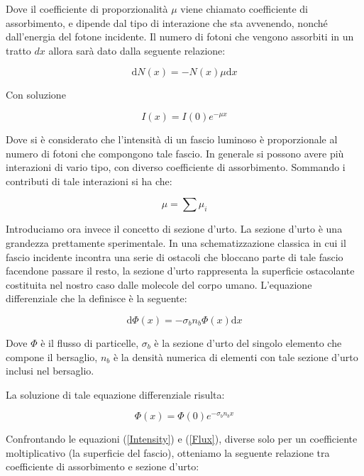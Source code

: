 Dove il coefficiente di proporzionalità $\mu$ viene chiamato coefficiente di assorbimento, e dipende dal tipo di interazione che sta avvenendo, nonché dall'energia del fotone incidente. Il numero di fotoni che vengono assorbiti in un tratto $dx$ allora sarà dato dalla seguente relazione:

\begin{equation}
\mathrm{d}N(x)=-N(x)\mu \mathrm{d}x
\end{equation}

Con soluzione

\begin{equation}
I(x)=I(0)e^{-\mu x}
\label{Intensity}
\end{equation}

Dove si è considerato che l'intensità di un fascio luminoso è proporzionale al numero di fotoni che compongono tale fascio.
In generale si possono avere più interazioni di vario tipo, con diverso coefficiente di assorbimento. Sommando i contributi di tale interazioni si ha che:

\begin{equation}
\mu=\sum \mu_{i}
\end{equation}

Introduciamo ora invece il concetto di sezione d'urto. 
La sezione d'urto è una grandezza prettamente sperimentale. In una schematizzazione classica in cui il fascio incidente incontra una serie di ostacoli che bloccano parte di tale fascio facendone passare il resto, la sezione d'urto rappresenta la superficie ostacolante costituita nel nostro caso dalle molecole del corpo umano. L'equazione differenziale che la definisce è la seguente:

\begin{equation}
\mathrm{d}\Phi(x)=-\sigma_{b}n_{b}\Phi(x)\mathrm{d}x
\end{equation}

Dove $\Phi$ è il flusso di particelle, $\sigma_{b}$ è la sezione d'urto del singolo elemento che compone il bersaglio, $n_b$ è la densità numerica di elementi con tale sezione d'urto inclusi nel bersaglio.

La soluzione di tale equazione differenziale risulta:

\begin{equation}
\Phi(x)=\Phi(0)e^{-\sigma_{b}n_{b}x}
\label{Flux}
\end{equation}

Confrontando le equazioni (\ref{Intensity}) e (\ref{Flux}), diverse solo per un coefficiente moltiplicativo (la superficie del fascio), otteniamo la seguente relazione tra coefficiente di assorbimento e sezione d'urto:


